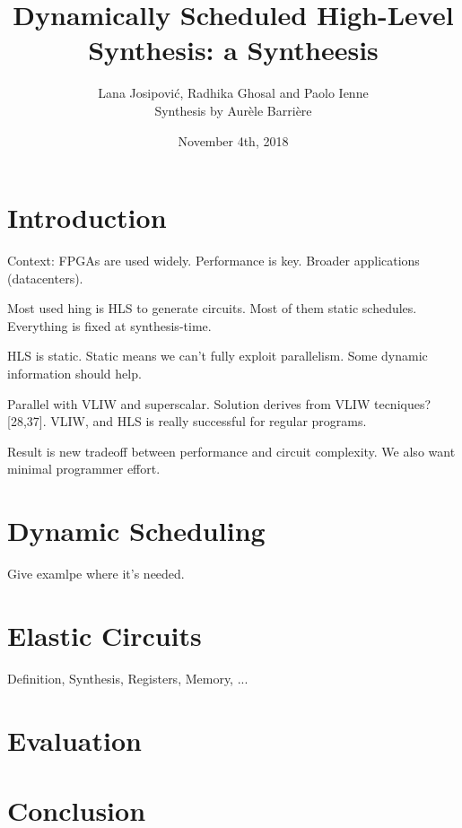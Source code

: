\documentclass{article}
\title{Dynamically Scheduled High-Level Synthesis: a Syntheesis}
\author{Lana Josipovi\'c, Radhika Ghosal and Paolo Ienne\\ Synthesis by Aur\`ele Barri\`ere}
\date{November 4th, 2018}
\begin{document}
\maketitle

\section{Introduction}

Context: FPGAs are used widely. Performance is key.
Broader applications (datacenters).

Most used hing is HLS to generate circuits. Most of them static schedules.
Everything is fixed at synthesis-time.

HLS is static. Static means we can't fully exploit parallelism.
Some dynamic information should help.

Parallel with VLIW and superscalar. Solution derives from VLIW tecniques? [28,37].
VLIW, and HLS is really successful for regular programs.

Result is new tradeoff between performance and circuit complexity.
We also want minimal programmer effort.

\section{Dynamic Scheduling}
Give examlpe where it's needed.

\section{Elastic Circuits}

Definition,
Synthesis,
Registers,
Memory, ...

\section{Evaluation}

\section{Conclusion}
\end{document}
